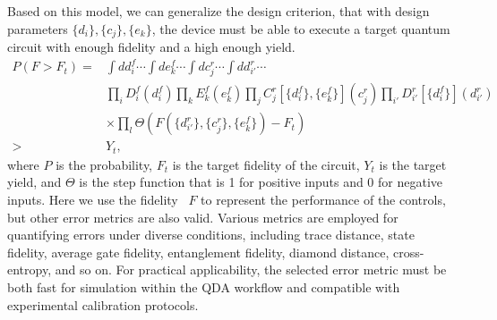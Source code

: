 \documentclass[a4paper,onecolumn,11pt,unpublished]{quantumarticle}
\newcommand{\setelem}[1]{\ensuremath{\{#1\}}}
\newcommand{\setelemthree}[3]{\setelem{#1},\setelem{#2},\setelem{#3}}
\begin{document}
Based on this model, we can generalize the design criterion, that with design parameters $\setelemthree{d_i}{c_j}{e_k}$, the device must be able to execute a target quantum circuit with enough fidelity and a high enough yield.
\begin{align}
  P(F >F_t) = & \int dd^f_i \cdots \int de^f_k \cdots \int dc^r_j \cdots \int dd^r_{i'} \cdots \nonumber                                                                                                                                              \\
              & \prod_i D^f_i(d^f_i)\prod_k E_k^f(e^f_k) \prod_j C^r_j[\setelem{d^f_i},\setelem{e^f_k}](c^r_j) \prod_{i'} D^r_{i'}[\setelem{d^f_i}](d^r_{i'})  \nonumber \\
             & \times \prod_l \Theta(F(\setelem{d^r_{i'}},\setelem{c^r_j},\setelem{e^f_k}) - F_t) \nonumber \\
  >           & Y_t, \label{eq:design_criteria_yield_instruction}
\end{align}
where $P$ is the probability, $F_t$ is the target fidelity of the circuit, $Y_t$ is the target yield, and $\Theta$ is the step function that is 1 for positive inputs and 0 for negative inputs. Here we use the fidelity~\cite{Nielsen2002A} $F$ to represent the performance of the controls, but other error metrics are also valid. Various metrics are employed for quantifying errors under diverse conditions, including trace distance, state fidelity, average gate fidelity, entanglement fidelity, diamond distance, cross-entropy, and so on\cite{Hashim2025Practical}. For practical applicability, the selected error metric must be both fast for simulation within the QDA workflow and compatible with experimental calibration protocols.
\end{document}

